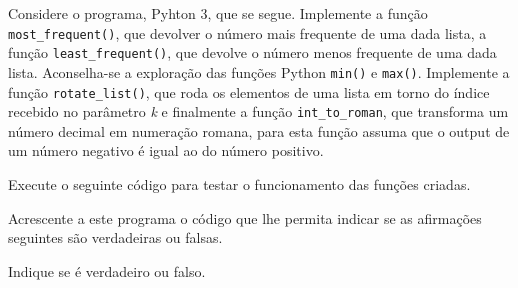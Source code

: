 \documentclass[12pt,varwidth=16cm,border=1pt]{standalone}
\begin{document}
Considere o programa, Pyhton 3, que se segue. Implemente a função \verb+most_frequent()+, que devolver o número mais frequente de uma dada lista, a função \verb+least_frequent()+, que devolve o número menos frequente de uma dada lista. Aconselha-se a exploração das funções Python \verb+min()+ e \verb+max()+. Implemente a função \verb+rotate_list()+, que roda os elementos de uma lista em torno do índice recebido no parâmetro \textit{k} e finalmente a função \verb+int_to_roman+, que transforma um número decimal em numeração romana, para esta função assuma que o output de um número negativo é igual ao do número positivo.



Execute o seguinte código para testar o funcionamento das funções criadas.



Acrescente a este programa o código que lhe permita indicar se as
afirmações seguintes são verdadeiras ou falsas.

Indique se é verdadeiro ou falso.
\end{document}
